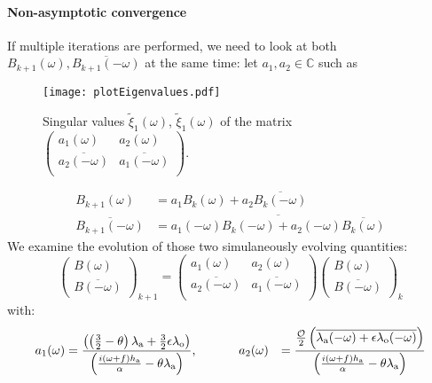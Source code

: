 \paragraph{Non-asymptotic convergence}
If multiple iterations are performed, we need to look at both
$B_{k+1}(\omega), \overline{B_{k+1}(-{\omega})}$
at the same time: let $a_1, a_2 \in \mathbb{C}$ such as
\begin{figure}
    \centering
    \texttt{[image: plotEigenvalues.pdf]}
	\caption{Singular values $\widetilde{\xi}_1(\omega)$,
	$\widetilde{\xi}_1(\omega)$ of the matrix $\begin{pmatrix}
	a_1(\omega) & a_2(\omega) \\
	\overline{a_2(-\omega)} & \overline{a_1(-\omega)} \\
	\end{pmatrix}$.
	}
    \label{fig:OASchwarz_singularValues}
\end{figure}
\begin{equation}
	\begin{aligned}
		B_{k+1}(\omega) &= a_1 B_{k}(\omega) + a_2
		\overline{B_{k}(-{\omega})}\\
		\overline{B_{k+1}(-{\omega})} &=
		\overline{a_1(-{\omega})
			B_{k}(-{\omega})
		+ {a_2(-{\omega})} \overline{B_{k}(\omega)}}
	\end{aligned}
\end{equation}
We examine the evolution of those two
simulaneously evolving quantities:
\begin{equation}
	\label{eq:OASchwarz_transitionMatrixDD26}
\begin{pmatrix}
	B(\omega) \\
	\overline{B(-{\omega})}
\end{pmatrix}_{k+1}
 =
\begin{pmatrix}
	a_1(\omega) & a_2(\omega) \\
	\overline{a_2(-{\omega})} & \overline{a_1(-{\omega})} \\
\end{pmatrix}
\begin{pmatrix}
	B(\omega) \\
	\overline{B(-{\omega})}
\end{pmatrix}_{k}
\end{equation}
with:
\begin{equation}
\begin{aligned}
    a_1(\omega)
    &= \frac{\left(\left(\frac{3}{2} - \theta\right) 
    \lambda_{\rm a}
    + \frac{3}{2} \epsilon \lambda_{\rm o} \right)}
	{\left(\frac{i(\omega+f)h_{\rm a}}{\alpha} -
		\theta \lambda_{\rm a}\right)}, ~~~~~~~~~~
    a_2(\omega)
    &= \frac{
 \frac{
    \mathcal{O}
    }{2}
    \left(
    \overline{
    \lambda_{\rm a}(-{\omega})
    +
    \epsilon\lambda_{\rm o}(-{\omega})}
    \right)   
    }{\left(\frac{i(\omega+f)h_{\rm a}}{\alpha} - \theta \lambda_{\rm a}\right)}
\end{aligned}
\end{equation}
